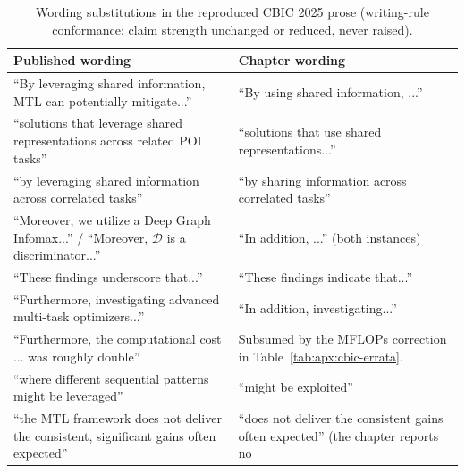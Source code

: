 \begin{table}[htb]
\caption{Wording substitutions in the reproduced CBIC 2025 prose (writing-rule
conformance; claim strength unchanged or reduced, never raised).}
\label{tab:apx:cbic-wording}
\centering
\small
\begin{tabular}{@{}p{}p{}@{}}
\toprule
\textbf{Published wording} & \textbf{Chapter wording} \\
\midrule
``By leveraging shared information, MTL can potentially mitigate...'' &
``By using shared information, ...'' \\
``solutions that leverage shared representations across related POI tasks'' &
``solutions that use shared representations...'' \\
``by leveraging shared information across correlated tasks'' &
``by sharing information across correlated tasks'' \\
``Moreover, we utilize a Deep Graph Infomax...'' /
``Moreover, $\mathcal{D}$ is a discriminator...'' &
``In addition, ...'' (both instances) \\
``These findings underscore that...'' &
``These findings indicate that...'' \\
``Furthermore, investigating advanced multi-task optimizers...'' &
``In addition, investigating...'' \\
``Furthermore, the computational cost ... was roughly double'' &
Subsumed by the MFLOPs correction in Table~\ref{tab:apx:cbic-errata}. \\
``where different sequential patterns might be leveraged'' &
``might be exploited'' \\
\addlinespace
``the MTL framework does not deliver the consistent, significant gains often
expected'' &
``does not deliver the consistent gains often expected'' (the chapter reports no

\end{tabular}
\end{table}
